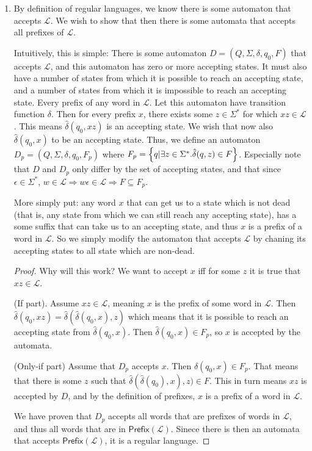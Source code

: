 \documentclass{article}
\begin{document}
\begin{enumerate}
    \item
        By definition of regular languages, we know there is some automaton that accepts $\mathcal{L}$. We wish to show that then there is some automata that accepts all prefixes of $\mathcal{L}$.

        Intuitively, this is simple: There is some automaton $D = (Q, \Sigma, \delta, q_0, F)$ that accepts $\mathcal{L}$, and this automaton has zero or more accepting states. It must also have a number of states from which it is possible to reach an accepting state, and a number of states from which it is impossible to reach an accepting state. Every prefix of any word in $\mathcal{L}$. Let this automaton have transition function $\delta$. Then for every prefix $x$, there exists some $z \in \Sigma^*$ for which $xz \in \mathcal{L}$. This means $\hat{\delta}(q_0, xz)$ is an accepting state. We wish that now also $\hat{\delta}(q_0, x)$ to be an accepting state. Thus, we define an automaton $D_p = (Q, \Sigma, \delta, q_0, F_p)$ where $F_p = \set{q  | \exists z \in \Sigma^* . \hat{\delta}(q, z) \in F}$. Especially note that $D$ and $D_p$ only differ by the set of accepting states, and that since $\epsilon \in \Sigma^*$, $w \in \mathcal{L} \Rightarrow w\epsilon \in \mathcal{L} \Rightarrow F \subseteq F_p$.

        More simply put: any word $x$ that can get us to a state which is not dead (that is, any state from which we can still reach any accepting state), has a some suffix that can take us to an accepting state, and thus $x$ is a prefix of a word in $\mathcal{L}$. So we simply modify the automaton that accepts $\mathcal{L}$ by chaning its accepting states to all state which are non-dead.

        \begin{proof}
            Why will this work? We want to accept $x$ iff for some $z$ it is true that $xz \in \mathcal{L}$.

            (If part). Assume $xz \in \mathcal{L}$, meaning $x$ is the prefix of some word in $\mathcal{L}$. Then $\hat{\delta}(q_0, xz) = \hat{\delta}(\hat{\delta}(q_0, x), z)$ which means that it is possible to reach an accepting state from $\hat{\delta}(q_0, x)$. Then  $\hat{\delta}(q_0, x) \in F_p$, so $x$ is accepted by the automata.

        (Only-if part) Assume that $D_p$ accepts $x$. Then $\hat{\delta}(q_0, x) \in F_p$. That means that there is some $z$ such that $\hat{\delta}(\hat{\delta}(q_0), x), z) \in F$. This in turn means $xz$ is accepted by $D$, and by the definition of prefixes, $x$ is a prefix of a word in $\mathcal{L}$.

        We have proven that $D_p$ accepts all words that are prefixes of words in $\mathcal{L}$, and thus all words that are in $\mathsf{Prefix}(\mathcal{L})$. Sinece there is then an automata that accepts $\mathsf{Prefix}(\mathcal{L})$, it is a regular language.
        \end{proof}
\end{enumerate} 
\end{document}
